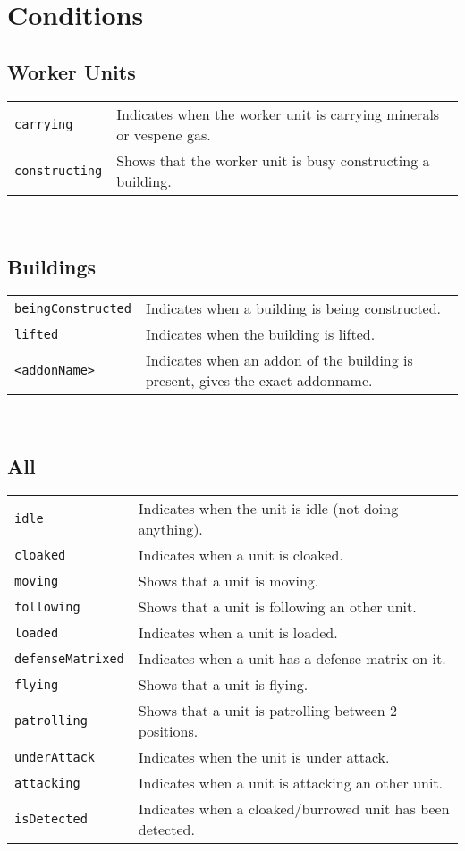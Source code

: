 \section{Conditions}
\label{conditions}

\subsection{Worker Units}
\begin{tabularx}{\textwidth}{lX}
 \verb|carrying| & Indicates when the worker unit is carrying minerals or vespene gas. \\
 \verb|constructing| & Shows that the worker unit is busy constructing a building.
\end{tabularx} \\

\subsection{Buildings}
\begin{tabularx}{\textwidth}{lX}
 \verb|beingConstructed| & Indicates when a building is being constructed. \\
 \verb|lifted| & Indicates when the building is lifted. \\
 \verb|<addonName>| & Indicates when an addon of the building is present, gives the exact addonname.
\end{tabularx} \\

\subsection{All}
\begin{tabularx}{\textwidth}{lX}
 \verb|idle| & Indicates when the unit is idle (not doing anything).\\
 \verb|cloaked| & Indicates when a unit is cloaked.\\
 \verb|moving| & Shows that a unit is moving.\\
 \verb|following| & Shows that a unit is following an other unit.\\
 \verb|loaded| & Indicates when a unit is loaded.\\
 \verb|defenseMatrixed| & Indicates when a unit has a defense matrix on it.\\
 \verb|flying| & Shows that a unit is flying.\\
 \verb|patrolling| & Shows that a unit is patrolling between 2 positions.\\
 \verb|underAttack| & Indicates when the unit is under attack.\\
 \verb|attacking | & Indicates when a unit is attacking an other unit.\\
 \verb|isDetected | & Indicates when a cloaked/burrowed unit has been detected.\\
\end{tabularx} \\

